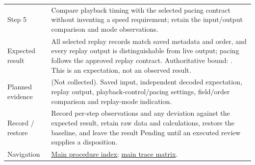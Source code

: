 \begin{tabularx}{\linewidth}{L{3.2cm}Y}
Step 5 & Compare playback timing with the selected pacing contract without inventing a speed requirement; retain the input/output comparison and mode observations.\\
Expected result & All selected replay records match saved metadata and order, and every replay output is distinguishable from live output; pacing follows the approved replay contract. Authoritative bound: . This is an expectation, not an observed result.\\
Planned evidence &  (Not collected). Saved input, independent decoded expectation, replay output, playback-control/pacing settings, field/order comparison and replay-mode indication.\\
Record / restore & Record per-step observations and any deviation against the expected result, retain raw data and calculations, restore the baseline, and leave the result Pending until an executed review supplies a disposition.\\
Navigation & \hyperref[Table:WeekTwoTests]{Main procedure index}; \hyperref[Table:TraceabilityMatrix]{main trace matrix}.\\
\end{tabularx}
\normalsize
